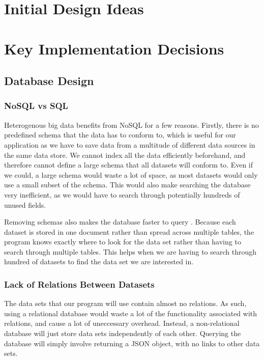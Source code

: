 \documentclass[titlepage]{article}
\begin{document}
\section{Initial Design Ideas}

\section{Key Implementation Decisions}
\subsection{Database Design}

\subsubsection{NoSQL vs SQL}
Heterogenous big data benefits from NoSQL for a few reasons. Firstly, there is no predefined schema that the data has to conform to, which is useful for our application as we have to save data from a multitude of different data sources in the same data store. We cannot index all the data efficiently beforehand, and therefore cannot define a large schema that all datasets will conform to. Even if we could, a large schema would waste a lot of space, as most datasets would only use a small subset of the schema. This would also make searching the database very inefficient, as we would have to search through potentially hundreds of unused fields.

Removing schemas also makes the database faster to query \cite{sqlvsnosql}. Because each dataset is stored in one document rather than spread across multiple tables, the program knows exactly where to look for the data set rather than having to search through multiple tables. This helps when we are having to search through hundred of datasets to find the data set we are interested in.

\subsubsection{Lack of Relations Between Datasets}
The data sets that our program will use contain almost no relations. As such, using a relational database would waste a lot of the functionality associated with relations, and cause a lot of uneccessary overhead. Instead, a non-relational database will just store data sets independently of each other. Querying the database will simply involve returning a JSON object, with no links to other data sets.
\end{document}
